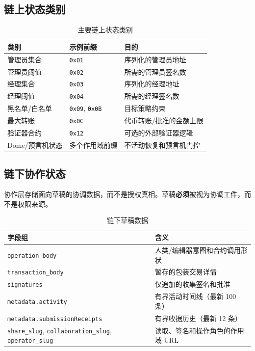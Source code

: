 \documentclass[11pt]{article}
\newcommand{\code}[1]{\texttt{#1}}
\newcommand{\must}{\textbf{必须}}
\begin{document}
\subsection{链上状态类别}
\begin{table}[h!]
  \centering
  \caption{主要链上状态类别}
  \begin{tabularx}{\textwidth}{>{\raggedright\arraybackslash}p{}>{\raggedright\arraybackslash}p{}X}
    \toprule
    类别 & 示例前缀 & 目的 \\
    \midrule
    管理员集合 & \code{0x01} & 序列化的管理员地址 \\
    管理员阈值 & \code{0x02} & 所需的管理员签名数 \\
    经理集合 & \code{0x03} & 序列化的经理地址 \\
    经理阈值 & \code{0x04} & 所需的经理签名数 \\
    黑名单/白名单 & \code{0x09}, \code{0x0B} & 目标策略约束 \\
    最大转账 & \code{0x0C} & 代币转账/批准的金额上限 \\
    验证器合约 & \code{0x12} & 可选的外部验证器逻辑 \\
    Dome/预言机状态 & 多个作用域前缀 & 不活动恢复和预言机门控 \\
    \bottomrule
  \end{tabularx}
\end{table}

\subsection{链下协作状态}
协作层存储面向草稿的协调数据，而不是授权真相。草稿\must{}被视为协调工件，而不是权限来源。

\begin{table}[h!]
  \centering
  \caption{链下草稿数据}
  \begin{tabularx}{\textwidth}{>{\raggedright\arraybackslash}p{}X}
    \toprule
    字段组 & 含义 \\
    \midrule
    \code{operation\_body} & 人类/编辑器意图和合约调用形状 \\
    \code{transaction\_body} & 暂存的包装交易详情 \\
    \code{signatures} & 仅追加的收集签名和批准 \\
    \code{metadata.activity} & 有界活动时间线（最新 100 条） \\
    \code{metadata.submissionReceipts} & 有界收据历史（最新 12 条） \\
    \code{share\_slug}, \code{collaboration\_slug}, \code{operator\_slug} & 读取、签名和操作角色的作用域 URL \\
    \bottomrule
  \end{tabularx}
\end{table}
\end{document}
